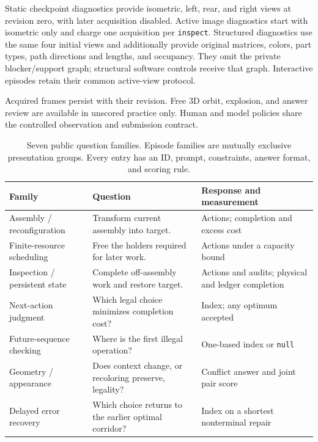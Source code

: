 \documentclass[10pt,twocolumn,letterpaper]{article}
\begin{document}
Static checkpoint diagnostics provide isometric, left, rear, and right
views at revision zero, with later acquisition disabled. Active image
diagnostics start with isometric only and charge one acquisition per
\texttt{inspect}. Structured diagnostics use the same four initial views
and additionally provide original matrices, colors, part types, path
directions and lengths, and occupancy. They omit the private
blocker/support graph; structural software controls receive that graph.
Interactive episodes retain their common active-view protocol.

Acquired frames persist with their revision. Free 3D orbit, explosion,
and answer review are available in unscored practice only. Human and
model policies share the controlled observation and submission contract.

\begin{table}[t]
\centering\small
\caption{Seven public question families. Episode families are mutually
exclusive presentation groups. Every entry has an ID, prompt, constraints,
answer format, and scoring rule.}
\begin{tabular}{p{}p{}p{}}\toprule
Family & Question & Response and measurement\\\midrule
Assembly / reconfiguration & Transform current assembly into target. & Actions; completion and excess cost\\
Finite-resource scheduling & Free the holders required for later work. & Actions under a capacity bound\\
Inspection / persistent state & Complete off-assembly work and restore target. & Actions and audits; physical and ledger completion\\
Next-action judgment & Which legal choice minimizes completion cost? & Index; any optimum accepted\\
Future-sequence checking & Where is the first illegal operation? & One-based index or \texttt{null}\\
Geometry / appearance & Does context change, or recoloring preserve, legality? & Conflict answer and joint pair score\\
Delayed error recovery & Which choice returns to the earlier optimal corridor? & Index on a shortest nonterminal repair\\
\bottomrule\end{tabular}
\label{tab:taxonomy}
\end{table}
\end{document}
